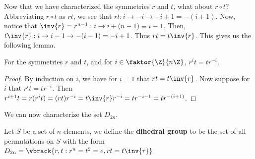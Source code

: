 Now that we have characterized the symmetries $r$ and  $t$, what about  $r \circ
t$? Abbreviating  $r \circ t$ as  $rt$, we see that  $rt:i \rightarrow -i
\rightarrow -i+1=-(i+1)$. Now, notice that $\inv{r}=r^{n-1}:i \rightarrow
i+(n-1) \equiv i-1$. Then, $t\inv{r}:i \rightarrow i-1 \rightarrow -(i-1)=-i+1$.
Thus $rt=t\inv{r}$. This gives us the following lemma.

\begin{lemma}\label{1.3.1}
    For the symmetries $r$ and  $t$, and for  $i \in \faktor{\Z}{n\Z}$,
    $r^it=tr^{-i}$.
\end{lemma}
\begin{proof}
    By induction on $i$, we have for  $i=1$ that  $rt=t\inv{r}$. Now suppose for
    $i$ that  $r^it=tr^{-i}$. Then
    $r^{i+1}t=r(r^it)=(rt)r^{-i}=t\inv{r}r^{-i}=tr^{-i-1}=tr^{-(i+1)}$.
\end{proof}

We can now characterize the set $D_{2n}$.

\begin{definition}
    Let $S$ be a set of  $n$ elements, we define the \textbf{dihedral group} to
    be the set of all permutations on $S$ with the form $D_{2n}=\vbrack{r,t :
    r^n=t^2=e, rt=t\inv{r}}$
\end{definition}


